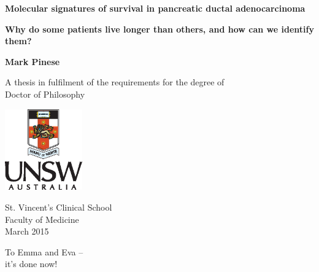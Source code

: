 \documentclass[11pt,a4paper,final,twoside]{memoir}
\newcommand{\thesisTitleMain}{Molecular signatures of survival in pancreatic ductal adenocarcinoma}
\newcommand{\thesisTitleSUB}{Why do some patients live longer than others, and how can we identify them?}
\begin{document}
\increaseBuild
\cleardoublepage

\begin{titlepage}
    \begin{center}
        \vspace*{1cm}
        
        \Large
        \textbf{\thesisTitleMain{}}
        
        \vspace{1cm}
        \normalsize
        \textbf{\thesisTitleSUB{}}
        
        \vspace{2.25cm}
        
        \normalsize
        \textbf{Mark Pinese}
        
        \vfill
        
        A thesis in fulfilment of the requirements for the degree of\\
        Doctor of Philosophy
        
        \vspace{3cm}
        
        \includegraphics[width=0.25\textwidth]{resources/PortraitColourPos}

        \vspace{1.5cm}

        St. Vincent's Clinical School\\
        Faculty of Medicine\\

		\vspace{1.2cm}
        March 2015
    \end{center}
\end{titlepage}


\cleardoublepage


\frontmatter

\cleardoublepage
{}
\begin{adjustwidth}{2em}{2em}
\noindent
To Emma and Eva -- ~\\
\hspace{1cm}it's done now!
\end{adjustwidth}
\end{document}
